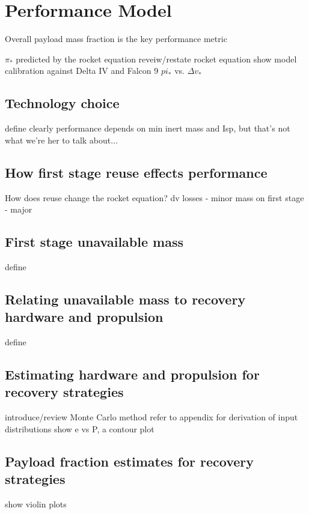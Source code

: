 \documentclass[conf]{new-aiaa}
\begin{document}
\section{Performance Model}

Overall payload mass fraction is the key performance metric

$\pi_*$ predicted by the rocket equation
    reveiw/restate rocket equation
    show model calibration against Delta IV and Falcon 9 $pi_*$ vs. $\Delta v_*$

\subsection{Technology choice}
define
clearly performance depends on min inert mass and Isp, but that's not what we're her to talk about...

\subsection{How first stage reuse effects performance}
How does reuse change the rocket equation?
    dv losses - minor
    mass on first stage - major

\subsection{First stage unavailable mass}
define

\subsection{Relating unavailable mass to recovery hardware and propulsion}
define

\subsection{Estimating hardware and propulsion for recovery strategies}
introduce/review Monte Carlo method
refer to appendix for derivation of input distributions
show e vs P, a contour plot

\subsection{Payload fraction estimates for recovery strategies}
show violin plots


\end{document}
